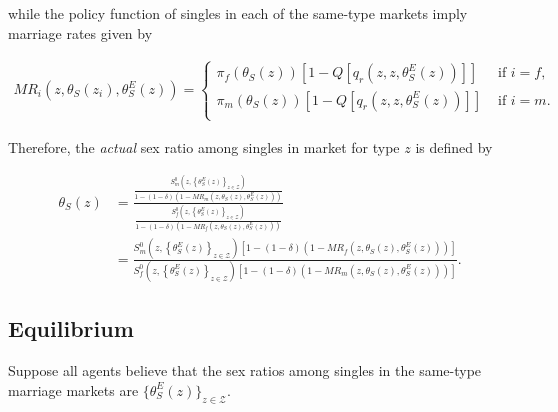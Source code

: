 \documentclass[12pt]{article}
\begin{document}
while the policy function of singles in each of the same-type markets imply marriage rates given by

\begin{align*}
MR_{i}\left(z,\theta_{S}(z_i),\theta_{S}^E(z)\right) =
\begin{cases}
\pi_f\left(\theta_{S}(z)\right)\left[1-Q\left[q_r\left(z,z,\theta_{S}^E(z)\right)\right]\right] & \text{ if } i=f, \\
\pi_m\left(\theta_{S}(z)\right)\left[1-Q\left[q_r\left(z,z,\theta_{S}^E(z)\right)\right]\right] & \text{ if } i=m. \\
\end{cases} 
\end{align*}

Therefore, the \textit{actual} sex ratio among singles in market for type $z$ is defined by

\begin{align*}
\theta_{S}(z) & = \frac{\frac{S_{m}^0\left(z,\left\lbrace \theta_{S}^E(z) \right\rbrace_{z\in\mathcal{Z}}\right)}{1-\left(1-\delta\right)\left(1-MR_{m}\left(z,\theta_{S}(z),\theta_{S}^E(z)\right)\right)}}{\frac{S_{f}^0\left(z,\left\lbrace \theta_{S}^E(z) \right\rbrace_{z\in\mathcal{Z}}\right)}{1-\left(1-\delta\right)\left(1-MR_{f}\left(z,\theta_{S}(z),\theta_{S}^E(z)\right)\right)}} \\ & = \frac{S_{m}^0\left(z,\left\lbrace \theta_{S}^E(z) \right\rbrace_{z\in\mathcal{Z}}\right)\left[1-\left(1-\delta\right)\left(1-MR_{f}\left(z,\theta_{S}(z),\theta_{S}^E(z)\right)\right)\right]}{S_{f}^0\left(z,\left\lbrace \theta_{S}^E(z) \right\rbrace_{z\in\mathcal{Z}}\right)\left[1-\left(1-\delta\right)\left(1-MR_{m}\left(z,\theta_{S}(z),\theta_{S}^E(z)\right)\right)\right]}.
\end{align*}

\subsection{Equilibrium}

Suppose all agents believe that the sex ratios among singles in the same-type marriage markets are $\{\theta_{S}^E(z)\}_{z\in\mathcal{Z}}$. 
\end{document}
